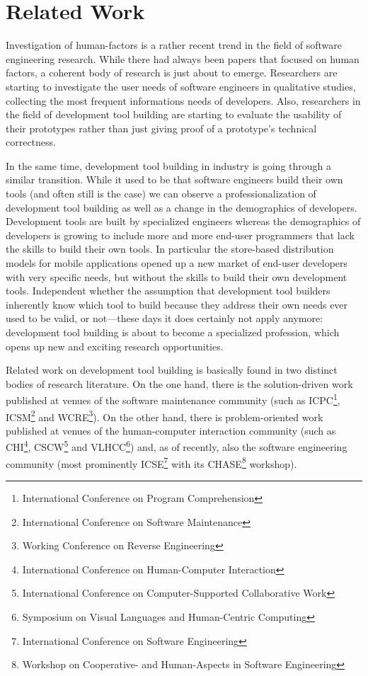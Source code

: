 \chapter{Related Work}
\label{the chapter on related work}

Investigation of human-factors is a rather recent trend in the field of software engineering research. While there had always been papers that focused on human factors, a coherent body of research is just about to emerge. 
Researchers are starting to investigate the user needs of software engineers in qualitative studies, collecting \eg the most frequent informations needs of developers. Also, researchers in the field of development tool building are starting to evaluate the usability of their prototypes rather than just giving proof of a prototype's technical correctness. 

In the same time, development tool building in industry is going through a similar transition. While it used to be that software engineers build their own tools (and often still is the case) we can observe a professionalization of development tool building as well as a change in the demographics of developers. Development tools are built by specialized engineers whereas the demographics of developers is growing to include more and more end-user programmers that lack the skills to build their own tools. In particular the store-based distribution models for mobile applications opened up a new market of end-user developers with very specific needs, but without the skills to build their own development tools. Independent whether the assumption that development tool builders inherently know which tool to build because they address their own needs ever used to be valid, or not---these days it does certainly not apply anymore: development tool building is about to become a specialized profession, which opens up new and exciting research opportunities.

Related work on development tool building is basically found in two distinct bodies of research literature. On the one hand, there is the solution-driven work published at venues of the software maintenance community (such as ICPC\footnote{International Conference on Program Comprehension}, ICSM\footnote{International Conference on Software Maintenance} and WCRE\footnote{Working Conference on Reverse Engineering}). On the other hand, there is problem-oriented work published at venues of the human-computer interaction community (such as CHI\footnote{International Conference on Human-Computer Interaction}, CSCW\footnote{International Conference on Computer-Supported Collaborative Work} and VLHCC\footnote{Symposium on Visual Languages and Human-Centric Computing}) and, as of recently, also the software engineering community (most prominently ICSE\footnote{International Conference on Software Engineering} with its CHASE\footnote{Workshop on Cooperative- and Human-Aspects in Software Engineering} workshop). 

